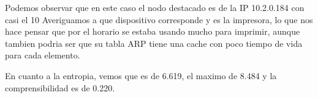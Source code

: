 \begin{figure}
	\begin{minipage}[b]{0.9\linewidth}
	\end{minipage}
\end{figure}

Podemos observar que en este caso el nodo destacado es de la IP 10.2.0.184 con casi el 10%
Averiguamos a que dispositivo corresponde y es la impresora, lo que nos hace pensar que
por el horario se estaba usando mucho para imprimir, aunque tambien podria ser
que su tabla ARP tiene una cache con poco tiempo de vida para cada elemento.

En cuanto a la entropia, vemos que es de 6.619, el maximo de 8.484 y la comprensibilidad es
de 0.220.

